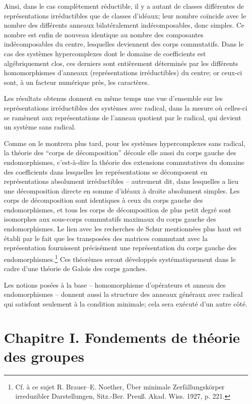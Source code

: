 Ainsi, dans le cas complètement réductible, il y a autant de classes différentes de représentations irréductibles que de classes d'idéaux; leur nombre coïncide avec le nombre des différents anneaux bilatéralement indécomposables, donc simples. Ce nombre est enfin de nouveau identique au nombre des composantes indécomposables du centre, lesquelles deviennent des corps commutatifs. Dans le cas des systèmes hypercomplexes dont le domaine de coefficients est algébriquement clos, ces derniers sont entièrement déterminés par les différents homomorphismes d'anneaux (représentations irréductibles) du centre; or ceux-ci sont, à un facteur numérique près, les caractères.

Les résultats obtenus donnent en même temps une vue d'ensemble sur les représentations irréductibles des systèmes avec radical, dans la mesure où celles-ci se ramènent aux représentations de l'anneau quotient par le radical, qui devient un système sans radical.

Comme on le montrera plus tard, pour les systèmes hypercomplexes sans radical, la théorie des ``corps de décomposition'' découle elle aussi du corps gauche des endomorphismes, c'est-à-dire la théorie des extensions commutatives du domaine des coefficients dans lesquelles les représentations se décomposent en représentations absolument irréductibles -- autrement dit, dans lesquelles a lieu une décomposition directe en somme d'idéaux à droite absolument simples. Les corps de décomposition sont identiques à ceux du corps gauche des endomorphismes, et tous les corps de décomposition de plus petit degré sont isomorphes aux sous-corps commutatifs maximaux du corps gauche des endomorphismes. Le lien avec les recherches de Schur mentionnées plus haut est établi par le fait que les transposées des matrices commutant avec la représentation fournissent précisément une représentation du corps gauche des endomorphismes.\footnote{Cf. à ce sujet R. Brauer--E. Noether, Über minimale Zerfällungskörper irreduzibler Darstellungen, Sitz.-Ber. Preuß. Akad. Wiss. 1927, p. 221.} Ces théorèmes seront développés systématiquement dans le cadre d'une théorie de Galois des corps gauches.

Les notions posées à la base -- homomorphisme d'opérateurs et anneau des endomorphismes -- donnent aussi la structure des anneaux généraux avec radical qui satisfont seulement à la condition minimale; cela sera exécuté d'un autre côté.

\section*{Chapitre I. Fondements de théorie des groupes}

